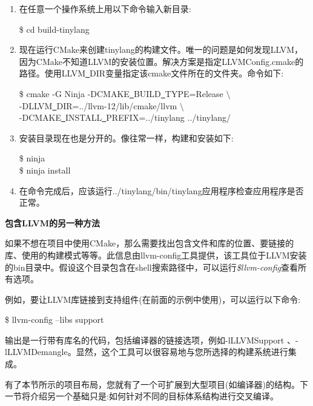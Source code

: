 \begin{enumerate}
	\item 在任意一个操作系统上用以下命令输入新目录:
	\begin{tcolorbox}[colback=white,colframe=black]
		\$ cd build-tinylang
	\end{tcolorbox}
	
	\item 现在运行CMake来创建tinylang的构建文件。唯一的问题是如何发现LLVM，因为CMake不知道LLVM的安装位置。解决方案是指定LLVMConfig.cmake的路径。使用LLVM\underline{~}DIR变量指定该cmake文件所在的文件夹。命令如下:
	\begin{tcolorbox}[colback=white,colframe=black]
		\$ cmake -G Ninja -DCMAKE\underline{~}BUILD\underline{~}TYPE=Release $\setminus$ \\
		\hspace*{1cm}-DLLVM\underline{~}DIR=../llvm-12/lib/cmake/llvm $\setminus$ \\
		\hspace*{1cm}-DCMAKE\underline{~}INSTALL\underline{~}PREFIX=../tinylang ../tinylang/
	\end{tcolorbox}

	\item 安装目录现在也是分开的。像往常一样，构建和安装如下:
	\begin{tcolorbox}[colback=white,colframe=black]
		\$ ninja \\
		\$ ninja install
	\end{tcolorbox}
	\item 在命令完成后，应该运行../tinylang/bin/tinylang应用程序检查应用程序是否正常。
\end{enumerate}


\hspace*{\fill} \par %
\textbf{包含LLVM的另一种方法}

如果不想在项目中使用CMake，那么需要找出包含文件和库的位置、要链接的库、使用的构建模式等等。此信息由llvm-config工具提供，该工具位于LLVM安装的bin目录中。假设这个目录包含在shell搜索路径中，可以运行\textit{\$llvm-config}查看所有选项。\par

例如，要让LLVM库链接到支持组件(在前面的示例中使用)，可以运行以下命令:\par

\begin{tcolorbox}[colback=white,colframe=black]
	\$ llvm-config –libs support
\end{tcolorbox}

输出是一行带有库名的代码，包括编译器的链接选项，例如-lLLVMSupport 、-lLLVMDemangle。显然，这个工具可以很容易地与您所选择的构建系统进行集成。\par

有了本节所示的项目布局，您就有了一个可扩展到大型项目(如编译器)的结构。下一节将介绍另一个基础只是:如何针对不同的目标体系结构进行交叉编译。\par












